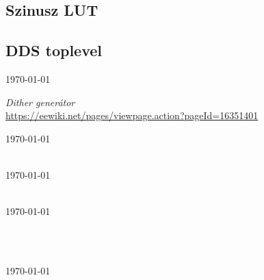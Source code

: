\documentclass[a4paper,11pt]{article}
\begin{document}
\subsection{Szinusz LUT}



\subsection{DDS toplevel}




\pagebreak
\begin{thebibliography}{}


\textit{}
\url{  }
\today


\textit{Dither generátor}\\
\url{https://eewiki.net/pages/viewpage.action?pageId=16351401}

\today


\textit{}\\
\url{}
\today


\textit{}\\
\url{}
\today


\textit{}\\



\textit{}\\
\url{}
\today


\end{thebibliography}
\end{document}
